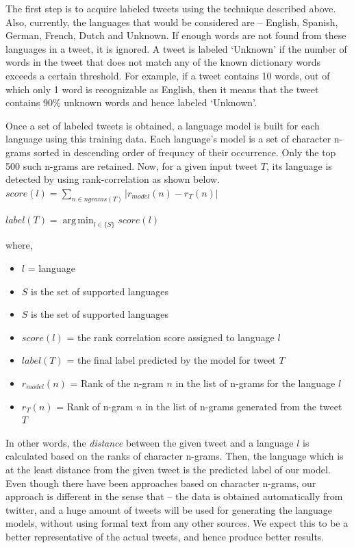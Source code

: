 \documentclass[11pt]{article}
\begin{document}
The first step is to acquire labeled tweets using the technique described above. Also, currently, the languages that would be considered are -- English, Spanish, German, French, Dutch and Unknown. If enough words are not found from these languages in a tweet, it is ignored. A tweet is labeled `Unknown' if the number of words in the tweet that does not match any of the known dictionary words exceeds a certain threshold. For example, if a tweet contains 10 words, out of which only 1 word is recognizable as English, then it means that the tweet contains 90\% unknown words and hence labeled `Unknown'.	

Once a set of labeled tweets is obtained, a language model is built for each language using this training data. Each language's model is a set of character n-grams sorted in descending order of frequncy of their occurrence. Only the top 500 such n-grams are retained. Now, for a given input tweet $T$, its language is detected by using rank-correlation as shown below.\\

$ score(l) = \sum_{n \in ngrams(T)} | r_{model}(n) - r_T(n) | $
\\
\par
$ label(T) = \operatorname*{arg\,min}_{l \in \{S\}} score(l) $ \\

\par
where,
\begin{itemize}
\item $l$ = language
\item $S$ is the set of supported languages
\item $S$ is the set of supported languages
\item $score(l)$ = the rank correlation score assigned to language $l$
\item $label(T)$ = the final label predicted by the model for tweet $T$
\item $r_{model}(n)$ = Rank of the n-gram $n$ in the list of n-grams for the language $l$
\item $r_T(n)$ = Rank of n-gram $n$ in the list of n-grams generated from the tweet $T$
\end{itemize}

In other words, the \emph{distance} between the given tweet and a language $l$ is calculated based on the ranks of character n-grams. Then, the language which is at the least distance from the given tweet is the predicted label of our model.
Even though there have been approaches based on character n-grams, our approach is different in the sense that -- the data is obtained automatically from twitter, and a huge amount of tweets will be used for generating the language models, without using formal text from any other sources. We expect this to be a better representative of the actual tweets, and hence produce better results.
\end{document}
